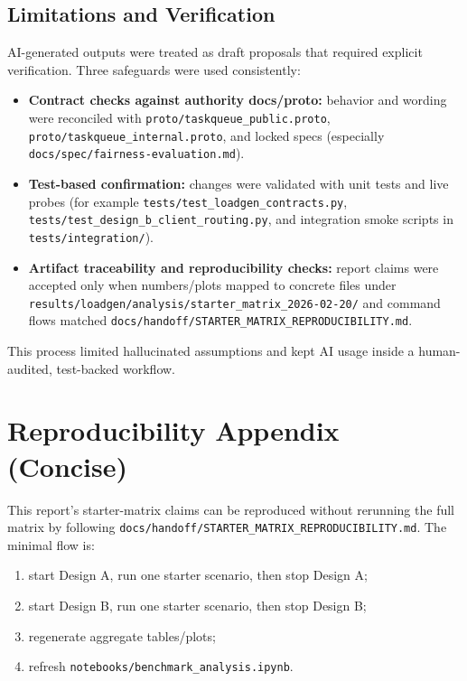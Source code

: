 \documentclass[11pt]{article}
\begin{document}
\subsection{Limitations and Verification}
AI-generated outputs were treated as draft proposals that required explicit verification.
Three safeguards were used consistently:
\begin{itemize}
    \item \textbf{Contract checks against authority docs/proto:} behavior and wording were reconciled with \texttt{proto/taskqueue\_public.proto}, \texttt{proto/taskqueue\_internal.proto}, and locked specs (especially \texttt{docs/spec/fairness-evaluation.md}).
    \item \textbf{Test-based confirmation:} changes were validated with unit tests and live probes (for example \texttt{tests/test\_loadgen\_contracts.py}, \texttt{tests/test\_design\_b\_client\_routing.py}, and integration smoke scripts in \texttt{tests/integration/}).
    \item \textbf{Artifact traceability and reproducibility checks:} report claims were accepted only when numbers/plots mapped to concrete files under \texttt{results/loadgen/analysis/starter\_matrix\_2026-02-20/} and command flows matched \texttt{docs/handoff/STARTER\_MATRIX\_REPRODUCIBILITY.md}.
\end{itemize}
This process limited hallucinated assumptions and kept AI usage inside a human-audited, test-backed workflow.

\section{Reproducibility Appendix (Concise)}
This report's starter-matrix claims can be reproduced without rerunning the full matrix by following \texttt{docs/handoff/STARTER\_MATRIX\_REPRODUCIBILITY.md}.
The minimal flow is:
\begin{enumerate}
    \item start Design A, run one starter scenario, then stop Design A;
    \item start Design B, run one starter scenario, then stop Design B;
    \item regenerate aggregate tables/plots;
    \item refresh \texttt{notebooks/benchmark\_analysis.ipynb}.
\end{enumerate}
\end{document}
